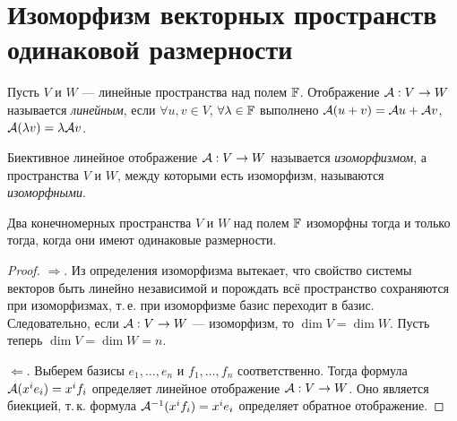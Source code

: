 \section{Изоморфизм векторных пространств одинаковой размерности}

\begin{definition}
    Пусть $V$ и $W$ --- линейные пространства над полем $\mathbb{F}$. Отображение $\mathcal{A}: V \to W$ называется \textit{линейным}, если $\forall u, v \in V$, $\forall \lambda \in \mathbb{F}$ выполнено $\mathcal{A}(u + v) = \mathcal{A} u + \mathcal{A} v$, $\mathcal{A}(\lambda v) = \lambda\mathcal{A} v$.
\end{definition}

\begin{definition}
    Биективное линейное отображение $\mathcal{A}: V \to W$ называется \textit{изоморфизмом}, а пространства $V$ и $W$, между которыми есть изоморфизм, называются \textit{изоморфными}.
\end{definition}

\begin{theorem}
    Два конечномерных пространства $V$ и $W$ над полем $\mathbb{F}$ изоморфны тогда и только тогда, когда они имеют одинаковые размерности.
\end{theorem}

\begin{proof}
    $\Rightarrow$. Из определения изоморфизма вытекает, что свойство системы векторов быть линейно независимой и порождать всё пространство сохраняются при изоморфизмах, т.\,е. при изоморфизме базис переходит в базис. Следовательно, если $\mathcal{A}: V \to W$ --- изоморфизм, то $\dim V = \dim W$. Пусть теперь $\dim V = \dim W = n$.

    $\Leftarrow$. Выберем базисы $e_1, \ldots, e_n$ и $f_1, \ldots, f_n$ соответственно. Тогда формула $\mathcal{A}(x^ie_i) = x^if_i$ определяет линейное отображение $\mathcal{A}: V \to W$. Оно является биекцией, т.\,к. формула $\mathcal{A}^{-1}(x^if_i) = x^ie_i$ определяет обратное отображение.
\end{proof}

